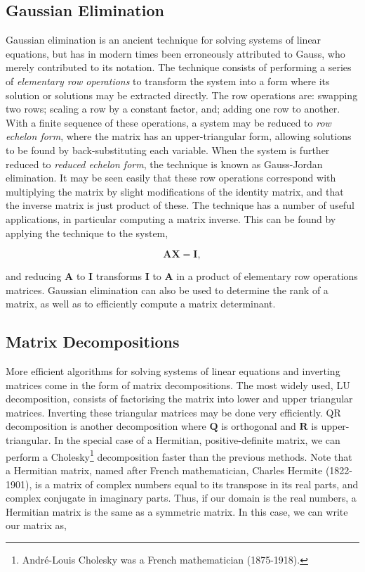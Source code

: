 \documentclass[11pt]{amsart}
\begin{document}
\subsection{Gaussian Elimination}

Gaussian elimination is an ancient technique for solving systems of linear equations, but has in modern times been erroneously attributed to Gauss, who merely contributed to its notation. The technique consists of performing a series of \emph{elementary row operations} to transform the system into a form where its solution or solutions may be extracted directly. The row operations are: swapping two rows; scaling a row by a constant factor, and; adding one row to another. With a finite sequence of these operations, a system may be reduced to \emph{row echelon form}, where the matrix has an upper-triangular form, allowing solutions to be found by back-substituting each variable. When the system is further reduced to \emph{reduced echelon form}, the technique is known as Gauss-Jordan elimination. It may be seen easily that these row operations correspond with multiplying the matrix by slight modifications of the identity matrix, and that the inverse matrix is just product of these. The technique has a number of useful applications, in particular computing a matrix inverse. This can be found by applying the technique to the system,

$$\mathbf{A}\mathbf{X} = \mathbf{I},$$

and reducing $\mathbf{A}$ to $\mathbf{I}$ transforms $\mathbf{I}$ to $\mathbf{A}$ in a product of elementary row operations matrices. Gaussian elimination can also be used to determine the rank of a matrix, as well as to efficiently compute a matrix determinant.

\subsection{Matrix Decompositions}

More efficient algorithms for solving systems of linear equations and inverting matrices come in the form of matrix decompositions. The most widely used, LU decomposition, consists of factorising the matrix into lower and upper triangular matrices. Inverting these triangular matrices may be done very efficiently. QR decomposition is another decomposition where $\mathbf{Q}$ is orthogonal and $\mathbf{R}$ is upper-triangular. In the special case of a Hermitian, positive-definite matrix, we can perform a Cholesky\footnote{Andr\'e-Louis Cholesky was a French mathematician (1875-1918).} decomposition faster than the previous methods. Note that a Hermitian matrix, named after French mathematician, Charles Hermite (1822-1901), is a matrix of complex numbers equal to its transpose in its real parts, and complex conjugate in imaginary parts. Thus, if our domain is the real numbers, a Hermitian matrix is the same as a symmetric matrix. In this case, we can write our matrix as,
\end{document}

